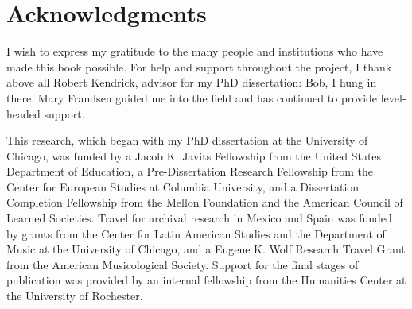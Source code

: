 \chapter{Acknowledgments}
\label{ch:thanks}

I wish to express my gratitude to the many people and institutions who have
made this book possible.
For help and support throughout the project, I thank above all Robert Kendrick,
advisor for my PhD dissertation: Bob, I hung in there. 
Mary Frandsen guided me into the field and has continued to provide
level-headed support.

This research, which began with my PhD dissertation at the University of
Chicago, was funded by a Jacob K. Javits Fellowship from the United States
Department of Education, a Pre-Dissertation Research Fellowship from the
Center for European Studies at Columbia University, and a Dissertation
Completion Fellowship from the Mellon Foundation and the American Council of
Learned Societies.
Travel for archival research in Mexico and Spain was funded by grants from the
Center for Latin American Studies and the Department of Music at the
University of Chicago, and a Eugene K. Wolf Research Travel Grant from the
American Musicological Society.
Support for the final stages of publication was provided by an internal
fellowship from the Humanities Center at the University of Rochester.

